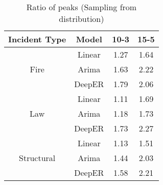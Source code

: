



\begin{table}[!ht]
\centering
\vspace{3mm}
\begin{tabular}{|c|c|c|c|}
\hline
\textbf{Incident Type}&\textbf{Model}&\textbf{10-3}&\textbf{15-5}\\
\hline
\multirow{3}{*}{Fire} &Linear& 1.27 & 1.64\\
&Arima& 1.63 & 2.22\\
&DeepER& 1.79 &2.06\\
\hline
\multirow{3}{*}{Law} &Linear& 1.11 & 1.69\\
&Arima& 1.18 & 1.73\\
&DeepER&1.73 &2.27\\
\hline
\multirow{3}{*}{Structural} &Linear& 1.13 &1.51\\
&Arima & 1.44 & 2.03\\
&DeepER&1.58 &2.21\\
\hline


\end{tabular}
\vspace{3mm}
\caption{Ratio of peaks (Sampling from distribution)}
\label{table:distPeaks}
\end{table}



